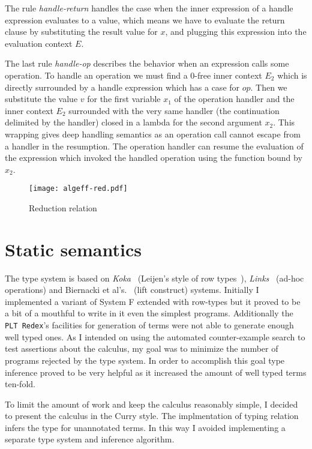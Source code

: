 \documentclass[inz, english, longabstract]{iithesis}
\newcommand{\Redex}{\texttt{PLT Redex}}
\begin{document}
The rule \textit{handle-return} handles the case when the inner expression of a handle expression evaluates to a value, which means we have to evaluate the return clause by substituting the result value for $ x $, and plugging this expression into the evaluation context $ E $.

The last rule \textit{handle-op} describes the behavior when an expression calls some operation.
To handle an operation we must find a $0$-free inner context $ E_2 $ which is directly surrounded by a handle expression which has a case for $ op $.
Then we substitute the value $ v $ for the first variable $x_1$ of the operation handler and the inner context $ E_2 $ surrounded with the very same handler (the continuation delimited by the handler) closed in a lambda for the second argument $x_2$.
This wrapping gives deep handling semantics as an operation call cannot escape from a handler in the resumption.
The operation handler can resume the evaluation of the expression which invoked the handled operation using the function bound by $x_2$.

\begin{figure}
  \centering
  \texttt{[image: algeff-red.pdf]}
  \caption{Reduction relation} 
  \label{fig:algeff-red}
\end{figure} 

\section{Static semantics}
The type system is based on \emph{Koka}~\cite{Leijen2014} (Leijen's style of row types~\cite{Leijen2005}), \emph{Links}~\cite{Hillerstrom2016} (ad-hoc operations) and Biernacki et al's.~\cite{Biernacki2017} (lift construct) systems.
Initially I implemented a variant of System F extended with row-types but it proved to be a bit of a mouthful to write in it even the simplest programs.
Additionally the \Redex{}'s facilities for generation of terms were not able to generate enough well typed ones.
As I intended on using the automated counter-example search to test assertions about the calculus, my goal was to minimize the number of programs rejected by the type system.
In order to accomplish this goal type inference proved to be very helpful as it increased the amount of well typed terms ten-fold.

To limit the amount of work and keep the calculus reasonably simple, I decided to present the calculus in the Curry style.
The implmentation of typing relation infers the type for unannotated terms.
In this way I avoided implementing a separate type system and inference algorithm.
\end{document}
